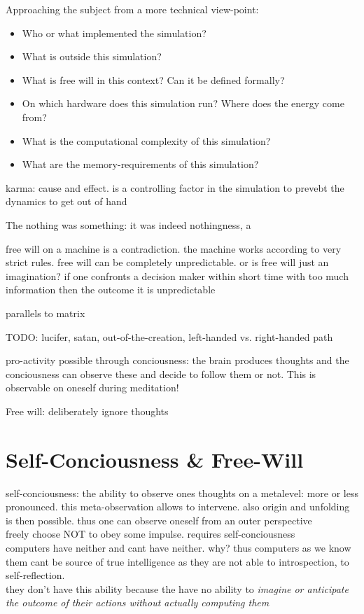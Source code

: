 \documentclass{article}
\begin{document}
Approaching the subject from a more technical view-point:

\begin{itemize}
\item Who or what implemented the simulation?
\item What is outside this simulation?
\item What is free will in this context? Can it be defined formally?
\item On which hardware does this simulation run? Where does the energy come from?
\item What is the computational complexity of this simulation?
\item What are the memory-requirements of this simulation?
\end{itemize}

karma: cause and effect. is a controlling factor in the simulation to prevebt the dynamics to get out of hand

The nothing was something: it was indeed nothingness, a

free will on a machine is a contradiction. the machine works according to very strict rules. free will can be completely unpredictable. or is free will just an imagination? if one confronts a decision maker within short time with too much information then the outcome it is unpredictable 

parallels to matrix

TODO: lucifer, satan, out-of-the-creation, left-handed vs. right-handed path

pro-activity possible through conciousness: the brain produces thoughts and the conciousness can observe these and decide to follow them or not. This is observable on oneself during meditation!

Free will: deliberately ignore thoughts

\section{Self-Conciousness \& Free-Will}
self-conciousness: the ability to observe ones thoughts on a metalevel: more or less pronounced. this meta-observation allows to intervene. also origin and unfolding is then possible. thus one can observe oneself from an outer perspective \\

freely choose NOT to obey some impulse. requires self-conciousness \\

computers have neither and cant have neither. why? thus computers as we know them cant be source of true intelligence as they are not able to introspection, to self-reflection. \\
they don't have this ability because the have no ability to \textit{imagine or anticipate the outcome of their actions without actually computing them}




\end{document}
